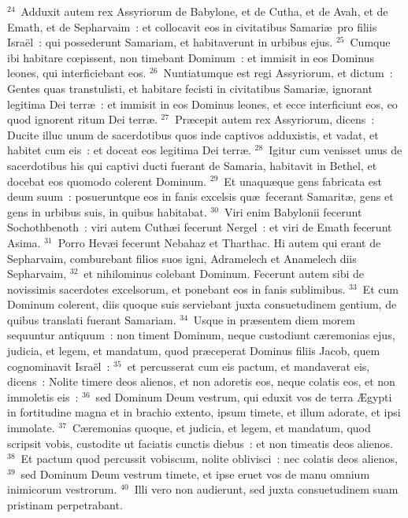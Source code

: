 ${}^{24}$~Adduxit autem rex Assyriorum de Babylone, et de Cutha, et de Avah, et de Emath, et de Sepharvaim~: et collocavit eos in civitatibus Samari\ae\ pro filiis Isra\"el~: qui possederunt Samariam, et habitaverunt in urbibus ejus.
${}^{25}$~Cumque ibi habitare cœpissent, non timebant Dominum~: et immisit in eos Dominus leones, qui interficiebant eos.
${}^{26}$~Nuntiatumque est regi Assyriorum, et dictum~: Gentes quas transtulisti, et habitare fecisti in civitatibus Samari\ae , ignorant legitima Dei terr\ae~: et immisit in eos Dominus leones, et ecce interficiunt eos, eo quod ignorent ritum Dei terr\ae .
${}^{27}$~Pr\ae cepit autem rex Assyriorum, dicens~: Ducite illuc unum de sacerdotibus quos inde captivos adduxistis, et vadat, et habitet cum eis~: et doceat eos legitima Dei terr\ae .
${}^{28}$~Igitur cum venisset unus de sacerdotibus his qui captivi ducti fuerant de Samaria, habitavit in Bethel, et docebat eos quomodo colerent Dominum.
${}^{29}$~Et unaqu\ae que gens fabricata est deum suum~: posueruntque eos in fanis excelsis qu\ae\ fecerant Samarit\ae , gens et gens in urbibus suis, in quibus habitabat.
${}^{30}$~Viri enim Babylonii fecerunt Sochothbenoth~: viri autem Cuth\ae i fecerunt Nergel~: et viri de Emath fecerunt Asima.
${}^{31}$~Porro Hev\ae i fecerunt Nebahaz et Tharthac. Hi autem qui erant de Sepharvaim, comburebant filios suos igni, Adramelech et Anamelech diis Sepharvaim,
${}^{32}$~et nihilominus colebant Dominum. Fecerunt autem sibi de novissimis sacerdotes excelsorum, et ponebant eos in fanis sublimibus.
${}^{33}$~Et cum Dominum colerent, diis quoque suis serviebant juxta consuetudinem gentium, de quibus translati fuerant Samariam.
${}^{34}$~Usque in pr\ae sentem diem morem sequuntur antiquum~: non timent Dominum, neque custodiunt c\ae remonias ejus, judicia, et legem, et mandatum, quod pr\ae ceperat Dominus filiis Jacob, quem cognominavit Isra\"el~:
${}^{35}$~et percusserat cum eis pactum, et mandaverat eis, dicens~: Nolite timere deos alienos, et non adoretis eos, neque colatis eos, et non immoletis eis~:
${}^{36}$~sed Dominum Deum vestrum, qui eduxit vos de terra \AE gypti in fortitudine magna et in brachio extento, ipsum timete, et illum adorate, et ipsi immolate.
${}^{37}$~C\ae remonias quoque, et judicia, et legem, et mandatum, quod scripsit vobis, custodite ut faciatis cunctis diebus~: et non timeatis deos alienos.
${}^{38}$~Et pactum quod percussit vobiscum, nolite oblivisci~: nec colatis deos alienos,
${}^{39}$~sed Dominum Deum vestrum timete, et ipse eruet vos de manu omnium inimicorum vestrorum.
${}^{40}$~Illi vero non audierunt, sed juxta consuetudinem suam pristinam perpetrabant.
